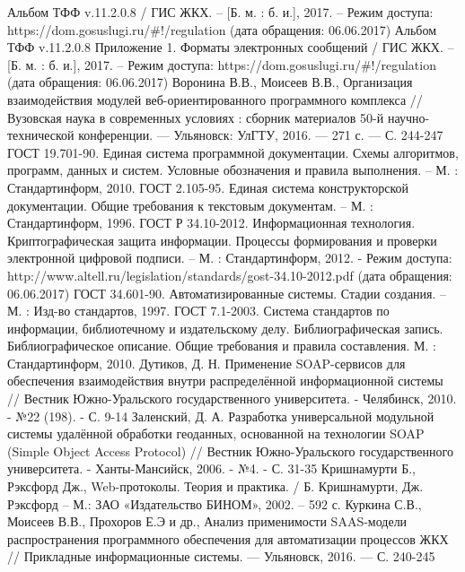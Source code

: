 \renewcommand{\refname}{Список использованных источников}

\begin{thebibliography}{99}
	 Альбом ТФФ v.11.2.0.8 / ГИС ЖКХ. – [Б. м. : б. и.], 2017. – Режим доступа: https://dom.gosuslugi.ru/\#!/regulation (дата обращения: 06.06.2017)
	 Альбом ТФФ v.11.2.0.8 Приложение 1. Форматы электронных сообщений / ГИС ЖКХ. – [Б. м. : б. и.], 2017. – Режим доступа: https://dom.gosuslugi.ru/\#!/regulation (дата обращения: 06.06.2017)
	 Воронина В.В., Моисеев В.В., Организация взаимодействия модулей веб-ориентированного программного комплекса // Вузовская наука в современных условиях : сборник материалов 50-й научно-технической конференции. — Ульяновск: УлГТУ, 2016. — 271 с. — С. 244-247
	 ГОСТ 19.701-90. Единая система программной документации. Схемы алгоритмов, программ, данных и систем. Условные обозначения и правила выполнения. – М. : Стандартинформ, 2010.
	 ГОСТ 2.105-95. Единая система конструкторской документации. Общие требования к текстовым документам. – М. : Стандартинформ, 1996.
	 ГОСТ Р 34.10-2012. Информационная технология. Криптографическая защита информации. Процессы формирования и проверки электронной цифровой подписи. – М. : Стандартинформ, 2012. - Режим доступа: http://www.altell.ru/legislation/standards/gost-34.10-2012.pdf (дата обращения: 06.06.2017)
	 ГОСТ 34.601-90. Автоматизированные системы. Стадии создания. – М. : Изд-во стандартов, 1997.
	 ГОСТ 7.1-2003. Система стандартов по информации, библиотечному и издательскому делу. Библиографическая запись. Библиографическое описание. Общие требования и правила составления.  М. : Стандартинформ, 2010.
	 Дутиков, Д. Н. Применение SOAP-сервисов для обеспечения взаимодействия внутри распределённой информационной системы // Вестник Южно-Уральского государственного университета. - Челябинск, 2010. - №22 (198). - С. 9-14
	 Заленский, Д. А. Разработка универсальной модульной системы удалённой обработки геоданных, основанной на технологии SOAP (Simple Object Access Protocol) // Вестник Южно-Уральского государственного университета. - Ханты-Мансийск, 2006. - №4. - С. 31-35
	 Кришнамурти Б., Рэксфорд Дж., Web-протоколы. Теория и практика. / Б. Кришнамурти, Дж. Рэксфорд – М.: ЗАО «Издательство БИНОМ», 2002. – 592 с.
	 Куркина С.В., Моисеев В.В., Прохоров Е.Э и др., Анализ применимости SAAS-модели распространения программного обеспечения для автоматизации процессов ЖКХ // Прикладные информационные системы. — Ульяновск, 2016. — С. 240-245

\end{thebibliography}
